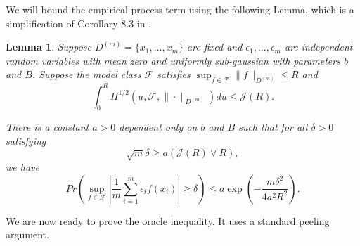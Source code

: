 \documentclass[10pt]{book}
\newtheorem{lemma}{Lemma}
\theoremstyle{definition}
\begin{document}
We will bound the empirical process term using the following Lemma, which is a simplification of Corollary 8.3 in \citet{van2000empirical}.

\begin{lemma}
	\label{lemma:cor83}
	Suppose $D^{(m)} = \{x_1,...,x_m\}$ are fixed and $\epsilon_1,...,\epsilon_m$ are independent random variables with mean zero and uniformly sub-gaussian with parameters $b$ and $B$. Suppose
	the model class $\mathcal{F}$ satisfies $\sup_{f\in\mathcal{F}}\|f\|_{D^{(m)}}\le R$
	and
	\[
	\int_{0}^{R}H^{1/2}(u,\mathcal{F},\|\cdot\|_{D^{(m)}})du \le \mathcal{J} (R).
	\]
	
	
	There is a constant $a > 0$ dependent only on $b$ and $B$ such that
	for all $\delta>0$ satisfying
	\[
	\sqrt{m}\delta\ge a(\mathcal{J} (R)\vee R),
	\]
	we have 
	\[
	Pr\left(\sup_{f\in\mathcal{F}}\left|\frac{1}{m}\sum_{i=1}^{m}\epsilon_{i}f(x_{i})\right|\ge\delta\right)
	\le 
	a\exp\left(-\frac{m\delta^{2}}{4a^{2}R^{2}}\right).
	\]
	
\end{lemma}

We are now ready to prove the oracle inequality. It uses a standard peeling argument.
\end{document}
